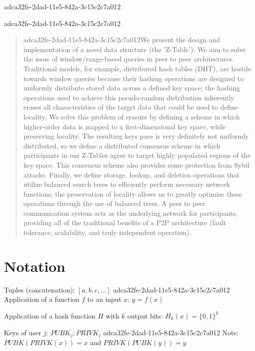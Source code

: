 \documentclass[12pt]{article}
\begin{document}
adca32fe-2dad-11e5-842a-3c15c2c7a012
\maketitle

adca32fe-2dad-11e5-842a-3c15c2c7a012\begin{abstract}
adca32fe-2dad-11e5-842a-3c15c2c7a012We present the design and implementation of a novel data structure (the 'Z-Table'). We aim to solve the issue of window/range-based queries in peer to peer architectures. Traditional models, for example,  distributed hash tables (DHT), are hostile towards window queries because their hashing operations are designed to uniformly distribute stored data across a defined key space; the hashing operations used to achieve this pseudo-random distribution inherently erases all characteristics of the target data that could be used to define locality. We solve this problem of erasure by defining a scheme in which higher-order data is mapped to a first-dimensional key space, while preserving locality. The resulting keys pace is very definitely not uniformly distributed, so we define a distributed consensus scheme in which participants in our Z-Tables agree to target highly populated regions of the key space. This consensus scheme also provides some protection from Sybil attacks. Finally, we define storage, lookup, and deletion operations that utilize balanced search trees to efficiently perform necessary network functions; the preservation of locality allows us to greatly optimize these operations through the use of balanced trees. A peer to peer communication system acts as the underlying network for participants, providing all of the traditional benefits of a P2P architecture (fault tolerance, scalability, and truly independent operation).
\end{abstract}

\section{Notation}

Tuples (concatenation): $[a,b,c,...]$
adca32fe-2dad-11e5-842a-3c15c2c7a012
Application of a function $f$ to an input $x$: $y=f(x)$

Application of a hash function $H$ with $k$ output bits: $H_{k}(x) = \{0,1\}^k$

Keys of user $j$: $ PUBK_j; PRIVK_j $
adca32fe-2dad-11e5-842a-3c15c2c7a012
Note: $PUBK(PRIVK(x)) = x$ and $PRIVK(PUBK(y)) = y$~
\end{document}
